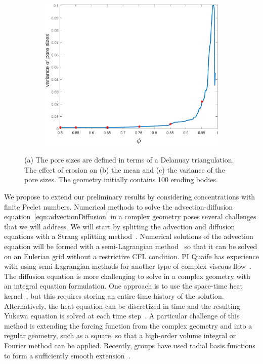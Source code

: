 \documentclass[11pt]{article}
\begin{document}
\begin{figure}
\begin{subfigure}[b]{0.33\textwidth}
  \includegraphics*[height=0.8\linewidth]{figs/gap_variance}
\caption{}
\end{subfigure}
  \caption{\label{fig:Eroding100gap_mean_var} (a) The pore sizes are
  defined in terms of a Delanuay triangulation. The effect of erosion on
  (b) the mean and (c) the variance of the pore sizes. The geometry
  initially contains 100 eroding bodies.}
\end{figure}



We propose to extend our preliminary results by considering
concentrations with finite Peclet numbers. Numerical methods to solve
the advection-diffusion equation~\eqref{eqn:advectionDiffusion} in a
complex geometry poses several challenges that we will address.  We will
start by splitting the advection and diffusion equations with a Strang
splitting method~\cite{str1968}.  Numerical solutions of the advection
equation will be formed with a semi-Lagrangian method~\cite{rob1981} so
that it can be solved on an Eulerian grid without a restrictive CFL
condition. PI Quaife has experience with using semi-Lagrangian
methods for another type of complex viscous flow~\cite{kab-qua-bir2017}.
The diffusion equation is more challenging to solve in a complex
geometry with an integral equation formulation.  One approach is to use
the space-time heat kernel~\cite{}, but this requires storing an entire
time history of the solution.  Alternatively, the heat equation can be
discretized in time and the resulting Yukawa equation is solved at each
time step~\cite{kro-qua2010}. A particular challenge of this method is
extending the forcing function from the complex geometry and into a
regular geometry, such as a square, so that a high-order volume integral
or Fourier method can be applied.  Recently, groups have used radial
basis functions to form a sufficiently smooth
extension~\cite{fry-kro-tor2019, fry-leh-tor2019}.
\end{document}
